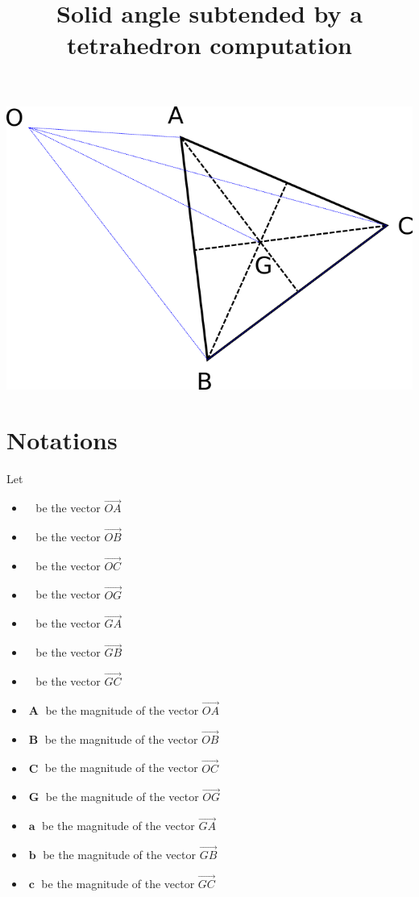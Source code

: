 \documentclass[10pt,a4paper]{article}
\title{Solid angle subtended by a tetrahedron computation}
\newcommand{\ud}[1]{\underline{#1}}
\DeclareMathOperator{\A}{\ud{A}}
\DeclareMathOperator{\B}{\ud{B}}
\DeclareMathOperator{\C}{\ud{C}}
\DeclareMathOperator{\G}{\ud{G}}
\DeclareMathOperator{\av}{\ud{a}}
\DeclareMathOperator{\bv}{\ud{b}}
\DeclareMathOperator{\cv}{\ud{c}}
\DeclareMathOperator{\An}{\mathbf{A}}
\DeclareMathOperator{\Bn}{\mathbf{B}}
\DeclareMathOperator{\Cn}{\mathbf{C}}
\DeclareMathOperator{\Gn}{\mathbf{G}}
\DeclareMathOperator{\an}{\mathbf{a}}
\DeclareMathOperator{\bn}{\mathbf{b}}
\DeclareMathOperator{\cn}{\mathbf{c}}
\begin{document}
\maketitle


\includegraphics[scale=0.4]{tetra.png} 


\section{Notations}

Let

\begin{itemize}
	\item $\A$ be the vector $\vec{OA}$
	\item $\B$ be the vector $\vec{OB}$
	\item $\C$ be the vector $\vec{OC}$
	\item $\G$ be the vector $\vec{OG}$
	\item $\av$ be the vector $\vec{GA}$
	\item $\bv$ be the vector $\vec{GB}$
	\item $\cv$ be the vector $\vec{GC}$
	\item $\An$ be the magnitude of the vector $\vec{OA}$
	\item $\Bn$ be the magnitude of the vector $\vec{OB}$
	\item $\Cn$ be the magnitude of the vector $\vec{OC}$
	\item $\Gn$ be the magnitude of the vector $\vec{OG}$
	\item $\an$ be the magnitude of the vector $\vec{GA}$
	\item $\bn$ be the magnitude of the vector $\vec{GB}$
	\item $\cn$ be the magnitude of the vector $\vec{GC}$
\end{itemize}
\end{document}
